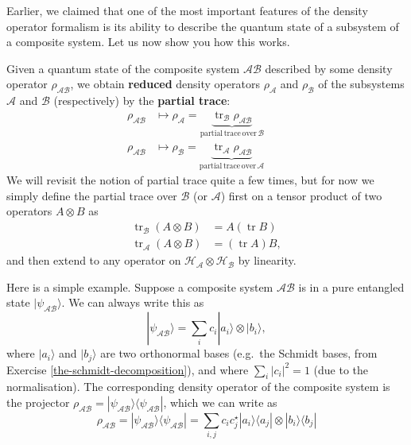 \documentclass[fleqn,a4paper]{article}
\theoremstyle{definition}
\theoremstyle{definition}
\theoremstyle{definition}
\theoremstyle{definition}
\theoremstyle{remark}
\begin{document}
Earlier, we claimed that one of the most important features of the density operator formalism is its ability to describe the quantum state of a subsystem of a composite system.
Let us now show you how this works.

Given a quantum state of the composite system \(\mathcal{AB}\) described by some density operator \(\rho_{\mathcal{AB}}\), we obtain \textbf{reduced} density operators \(\rho_{\mathcal{A}}\) and \(\rho_{\mathcal{B}}\) of the subsystems \(\mathcal{A}\) and \(\mathcal{B}\) (respectively) by the \textbf{partial trace}:
\[
  \begin{aligned}
    \rho_{\mathcal{AB}}
    &\longmapsto
    \rho_{\mathcal{A}}
    = \underbrace{\operatorname{tr}_{\mathcal{B}}\rho_{\mathcal{AB}}}_{\mathrm{partial\,trace\,over}\,\mathcal{B}}\qquad
  \\\rho_{\mathcal{AB}}
    &\longmapsto
    \rho_{\mathcal{B}}
    = \underbrace{\operatorname{tr}_{\mathcal{A}}\rho_{\mathcal{AB}}}_{\mathrm{partial\,trace\,over}\,\mathcal{A}}
  \end{aligned}
\]
We will revisit the notion of partial trace quite a few times, but for now we simply define the partial trace over \(\mathcal{B}\) (or \(\mathcal{A}\)) first on a tensor product of two operators \(A\otimes B\) as
\[
  \begin{aligned}
    \operatorname{tr}_{\mathcal{B}} (A\otimes B)
    &= A(\operatorname{tr}B)
  \\\operatorname{tr}_{\mathcal{A}} (A\otimes B)
    &= (\operatorname{tr}A) B,
  \end{aligned}
\]
and then extend to any operator on \(\mathcal{H}_{\mathcal{A}}\otimes\mathcal{H}_{\mathcal{B}}\) by linearity.

Here is a simple example.
Suppose a composite system \(\mathcal{AB}\) is in a pure entangled state \(|\psi_{\mathcal{AB}}\rangle\).
We can always write this as
\[
  |\psi_{\mathcal{AB}}\rangle
  = \sum_{i} c_{i} |a_i\rangle\otimes|b_i\rangle,
\]
where \(|a_i\rangle\) and \(|b_j\rangle\) are two orthonormal bases (e.g.~the Schmidt bases, from Exercise \ref{the-schmidt-decomposition}), and where \(\sum_i |c_i|^2 = 1\) (due to the normalisation).
The corresponding density operator of the composite system is the projector \(\rho_{\mathcal{AB}}= |\psi_{\mathcal{AB}}\rangle\langle\psi_{\mathcal{AB}}|\), which we can write as
\[
  \rho_{\mathcal{AB}}
  = |\psi_{\mathcal{AB}}\rangle\langle\psi_{\mathcal{AB}}|
  = \sum_{i,j} c_i c^\star_j |a_i\rangle\langle a_j| \otimes |b_i\rangle\langle b_j|
\]
\end{document}
